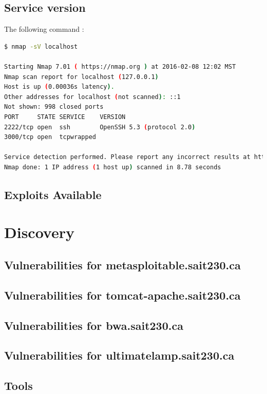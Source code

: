 \documentclass{article}
\begin{document}
\subsection{Service version}


\noindent The following command :
\begin{lstlisting}[language=bash]
$ nmap -sV localhost

Starting Nmap 7.01 ( https://nmap.org ) at 2016-02-08 12:02 MST
Nmap scan report for localhost (127.0.0.1)
Host is up (0.00036s latency).
Other addresses for localhost (not scanned): ::1
Not shown: 998 closed ports
PORT     STATE SERVICE    VERSION
2222/tcp open  ssh        OpenSSH 5.3 (protocol 2.0)
3000/tcp open  tcpwrapped

Service detection performed. Please report any incorrect results at https://nmap.org/submit/ .
Nmap done: 1 IP address (1 host up) scanned in 8.78 seconds

\end{lstlisting}

\subsection{Exploits Available}

\newpage
\section{Discovery}
\subsection{Vulnerabilities for metasploitable.sait230.ca}
\subsection{Vulnerabilities for tomcat-apache.sait230.ca}
\subsection{Vulnerabilities for bwa.sait230.ca}
\subsection{Vulnerabilities for ultimatelamp.sait230.ca}
\subsection{Tools}
\end{document}
